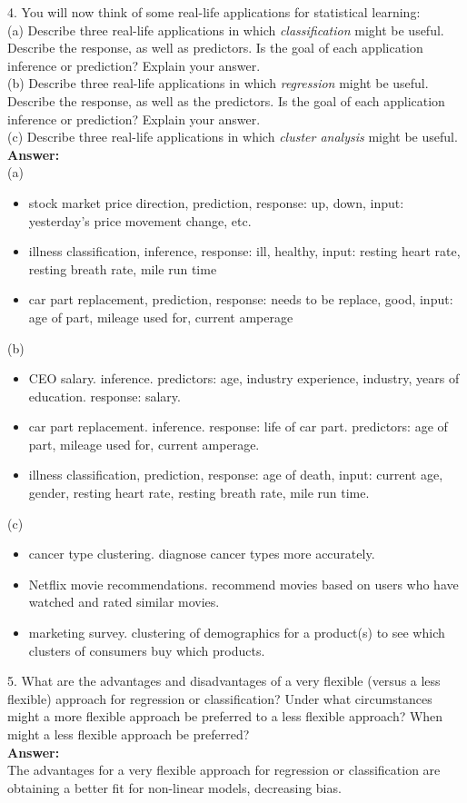 \documentclass[12pt]{article}
\begin{document}
4. You will now think of some real-life applications for statistical learning:\\
(a) Describe three real-life applications in which \textit{classification} might be useful. Describe the response, as well as predictors. Is the goal of each application inference or prediction? Explain your answer.\\
(b) Describe three real-life applications in which \textit{regression} might be useful. Describe the response, as well as the predictors. Is the goal of each application inference or prediction? Explain your answer.\\
(c) Describe three real-life applications in which \textit{cluster analysis} might be useful. \\
\textbf{Answer:}\\
(a) \begin{itemize}
	\item stock market price direction, prediction, response: up, down,
input: yesterday's price movement %
change, etc.
\item illness classification, inference, response: ill, healthy, input: resting
heart rate, resting breath rate, mile run time
\item car part replacement, prediction, response: needs to be replace, good,
input: age of part, mileage used for, current amperage
\end{itemize}

(b) \begin{itemize}
\item CEO salary. inference. predictors: age, industry experience, industry,
years of education. response: salary.
\item car part replacement. inference. response: life of car part. predictors: age
of part, mileage used for, current amperage.
\item illness classification, prediction, response: age of death,
input: current age, gender, resting heart rate, resting breath rate, mile run
time.

    \end{itemize}
(c) \begin{itemize}
\item cancer type clustering. diagnose cancer types more accurately.
\item Netflix movie recommendations. recommend movies based on users who have
watched and rated similar movies.
\item marketing survey. clustering of demographics for a product(s) to see which
clusters of consumers buy which products.

    \end{itemize}
5. What are the advantages and disadvantages of a very flexible (versus a less flexible) approach for regression or classification? Under what circumstances might a more flexible approach be preferred to a less flexible approach? When might a less flexible approach be preferred?\\
\textbf{Answer:}\\
The advantages for a very flexible approach for regression or classification
are obtaining a better fit for non-linear models, decreasing bias.
\end{document}
